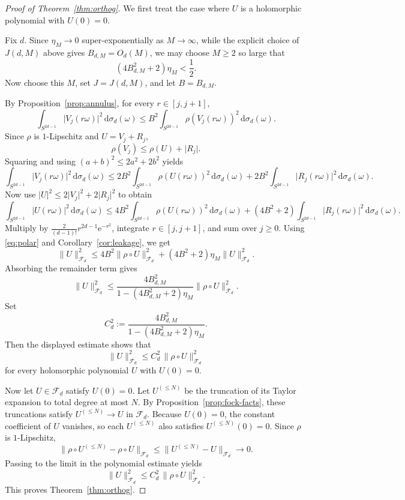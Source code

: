 \documentclass[11pt]{amsart}
\theoremstyle{remark}
\newcommand{\abs}[1]{\lvert #1 \rvert}
\newcommand{\norm}[1]{\lVert #1 \rVert}
\newcommand{\dd}{\mathrm{d}}
\newcommand{\ee}{\mathrm{e}}
\newcommand{\rhoFn}{\rho}
\newcommand{\Fd}{\mathcal{F}_d}
\newcommand{\Sphere}{S^{2d-1}}
\begin{document}
\begin{proof}[Proof of Theorem~\ref{thm:orthog}]
We first treat the case where $U$ is a holomorphic polynomial with
$U(0)=0$.

Fix $d$.  Since $\eta_M \to 0$ super-exponentially as $M \to \infty$,
while the explicit choice of $J(d,M)$ above gives $B_{d,M} = O_d(M)$,
we may choose $M \ge 2$ so large that
\[
(4B_{d,M}^2+2)\eta_M < \frac12.
\]
Now choose this $M$, set $J = J(d,M)$, and let $B = B_{d,M}$.

By Proposition~\ref{prop:annulus}, for every $r \in [j,j+1]$,
\[
\int_{\Sphere} \abs{V_j(r\omega)}^2\,\dd \sigma_d(\omega)
\le
B^2
\int_{\Sphere} \rhoFn(V_j(r\omega))^2\,\dd \sigma_d(\omega).
\]
Since $\rhoFn$ is $1$-Lipschitz and $U = V_j + R_j$,
\[
\rhoFn(V_j) \le \rhoFn(U) + \abs{R_j}.
\]
Squaring and using $(a+b)^2 \le 2a^2 + 2b^2$ yields
\[
\int_{\Sphere} \abs{V_j(r\omega)}^2\,\dd \sigma_d(\omega)
\le
2B^2 \int_{\Sphere} \rhoFn(U(r\omega))^2\,\dd \sigma_d(\omega)
+
2B^2 \int_{\Sphere} \abs{R_j(r\omega)}^2\,\dd \sigma_d(\omega).
\]
Now use $\abs{U}^2 \le 2\abs{V_j}^2 + 2\abs{R_j}^2$ to obtain
\[
\int_{\Sphere} \abs{U(r\omega)}^2\,\dd \sigma_d(\omega)
\le
4B^2 \int_{\Sphere} \rhoFn(U(r\omega))^2\,\dd \sigma_d(\omega)
+
(4B^2+2)\int_{\Sphere} \abs{R_j(r\omega)}^2\,\dd \sigma_d(\omega).
\]
Multiply by $\frac{2}{(d-1)!}r^{2d-1}\ee^{-r^2}$, integrate
$r \in [j,j+1]$, and sum over $j \ge 0$.  Using \eqref{eq:polar} and
Corollary~\ref{cor:leakage}, we get
\[
\norm{U}_{\Fd}^2
\le
4B^2 \norm{\rhoFn \circ U}_{\Fd}^2
+
(4B^2+2)\eta_M \norm{U}_{\Fd}^2.
\]
Absorbing the remainder term gives
\[
\norm{U}_{\Fd}^2
\le
\frac{4B_{d,M}^2}{1-(4B_{d,M}^2+2)\eta_M}
\norm{\rhoFn \circ U}_{\Fd}^2.
\]
Set
\[
C_d^2
:=
\frac{4B_{d,M}^2}{1-(4B_{d,M}^2+2)\eta_M}.
\]
Then the displayed estimate shows that
\[
\norm{U}_{\Fd}^2
\le
C_d^2\,\norm{\rhoFn \circ U}_{\Fd}^2
\]
for every holomorphic polynomial $U$ with $U(0)=0$.

Now let $U \in \Fd$ satisfy $U(0)=0$.  Let $U^{(\le N)}$ be the truncation
of its Taylor expansion to total degree at most $N$.  By
Proposition~\ref{prop:fock-facts}, these truncations satisfy
$U^{(\le N)} \to U$ in $\Fd$.  Because $U(0)=0$, the constant coefficient
of $U$ vanishes, so each $U^{(\le N)}$ also satisfies
$U^{(\le N)}(0)=0$.  Since $\rhoFn$ is
$1$-Lipschitz,
\[
\norm{\rhoFn \circ U^{(\le N)} - \rhoFn \circ U}_{\Fd}
\le
\norm{U^{(\le N)}-U}_{\Fd}
\to
0.
\]
Passing to the limit in the polynomial estimate yields
\[
\norm{U}_{\Fd}^2
\le
C_d^2\,\norm{\rhoFn \circ U}_{\Fd}^2.
\]
This proves Theorem~\ref{thm:orthog}.
\end{proof}
\end{document}
